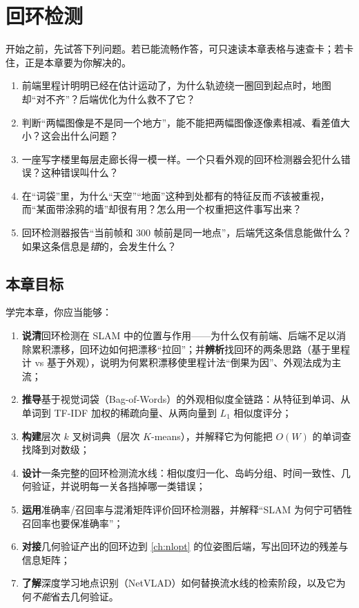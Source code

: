 \chapter{回环检测}
\label{ch:loop}


\begin{practice}[前置自测]
开始之前，先试答下列问题。若已能流畅作答，可只速读本章表格与速查卡；若卡住，正是本章要为你解决的。
\begin{enumerate}
  \item 前端里程计明明已经在估计运动了，为什么轨迹绕一圈回到起点时，地图却“对不齐”？后端优化为什么救不了它？
  \item 判断“两幅图像是不是同一个地方”，能不能把两幅图像逐像素相减、看差值大小？这会出什么问题？
  \item 一座写字楼里每层走廊长得一模一样。一个只看外观的回环检测器会犯什么错误？这种错误叫什么？
  \item 在“词袋”里，为什么“天空”“地面”这种到处都有的特征反而\emph{不}该被重视，而“某面带涂鸦的墙”却很有用？怎么用一个权重把这件事写出来？
  \item 回环检测器报告“当前帧和 $300$ 帧前是同一地点”，后端凭这条信息能做什么？如果这条信息是\emph{错}的，会发生什么？
\end{enumerate}
\end{practice}

\section*{本章目标}
学完本章，你应当能够：
\begin{enumerate}
  \item \textbf{说清}回环检测在 SLAM 中的位置与作用——为什么仅有前端、后端不足以消除累积漂移，回环边如何把漂移“拉回”；并\textbf{辨析}找回环的两条思路（基于里程计 vs 基于外观），说明为何累积漂移使里程计法“倒果为因”、外观法成为主流；
  \item \textbf{推导}基于视觉词袋（Bag-of-Words）的外观相似度全链路：从特征到单词、从单词到 TF-IDF 加权的稀疏向量、从两向量到 $L_1$ 相似度评分；
  \item \textbf{构建}层次 $k$ 叉树词典（层次 $K$-means），并解释它为何能把 $O(W)$ 的单词查找降到对数级；
  \item \textbf{设计}一条完整的回环检测流水线：相似度归一化、岛屿分组、时间一致性、几何验证，并说明每一关各挡掉哪一类错误；
  \item \textbf{运用}准确率/召回率与混淆矩阵评价回环检测器，并解释“SLAM 为何宁可牺牲召回率也要保准确率”；
  \item \textbf{对接}几何验证产出的回环边到 \cref{ch:nlopt} 的位姿图后端，写出回环边的残差与信息矩阵；
  \item \textbf{了解}深度学习地点识别（NetVLAD）如何替换流水线的检索阶段，以及它为何\emph{不能}省去几何验证。
\end{enumerate}

